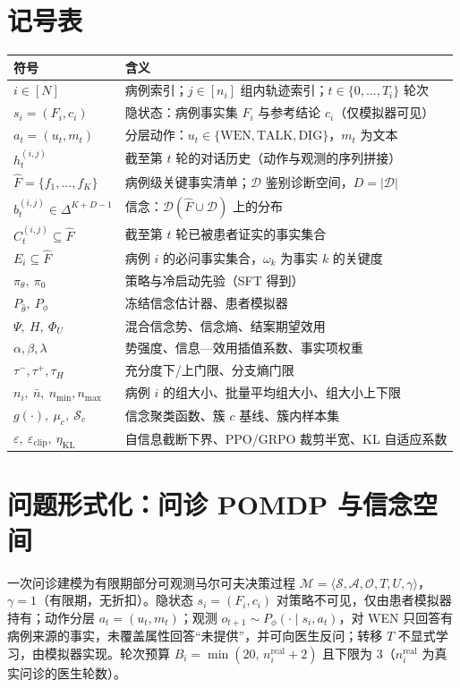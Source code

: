 \documentclass[11pt,a4paper]{ctexart}
\newcommand{\1}[1]{\mathbb{1}\!\left[#1\right]}
\newcommand{\Fhat}{\hat{F}}
\newcommand{\Dcal}{\mathcal{D}}
\newcommand{\Ocal}{\mathcal{O}}
\newcommand{\Scal}{\mathcal{S}}
\begin{document}
\section{记号表}
\begin{table}[h]\centering
\begin{tabular}{ll}
\toprule
符号 & 含义 \\
\midrule
$i \in [N]$ & 病例索引；$j \in [n_i]$ 组内轨迹索引；$t \in \{0,\dots,T_i\}$ 轮次 \\
$s_i=(F_i,c_i)$ & 隐状态：病例事实集 $F_i$ 与参考结论 $c_i$（仅模拟器可见） \\
$a_t=(u_t,m_t)$ & 分层动作：$u_t\in\{\mathrm{WEN},\mathrm{TALK},\mathrm{DIG}\}$，$m_t$ 为文本 \\
$h_t^{(i,j)}$ & 截至第 $t$ 轮的对话历史（动作与观测的序列拼接） \\
$\Fhat=\{f_1,\dots,f_K\}$ & 病例级关键事实清单；$\Dcal$ 鉴别诊断空间，$D=|\Dcal|$ \\
$b_t^{(i,j)}\in\Delta^{K+D-1}$ & 信念：$\Dcal(\Fhat\cup\Dcal)$ 上的分布 \\
$C_t^{(i,j)}\subseteq\Fhat$ & 截至第 $t$ 轮已被患者证实的事实集合 \\
$E_i\subseteq\Fhat$ & 病例 $i$ 的必问事实集合，$\omega_k$ 为事实 $k$ 的关键度 \\
$\pi_\theta,\ \pi_0$ & 策略与冷启动先验（SFT 得到） \\
$P_{\hat\theta},\ P_\phi$ & 冻结信念估计器、患者模拟器 \\
$\Psi,\ H,\ \Phi_U$ & 混合信念势、信念熵、结案期望效用 \\
$\alpha,\beta,\lambda$ & 势强度、信息—效用插值系数、事实项权重 \\
$\tau^-,\tau^+,\tau_H$ & 充分度下/上门限、分支熵门限 \\
$n_i,\ \bar n,\ n_{\min},n_{\max}$ & 病例 $i$ 的组大小、批量平均组大小、组大小上下限 \\
$g(\cdot),\ \mu_c,\ \Scal_c$ & 信念聚类函数、簇 $c$ 基线、簇内样本集 \\
$\varepsilon,\ \varepsilon_{\mathrm{clip}},\ \eta_{\mathrm{KL}}$ & 自信息截断下界、PPO/GRPO 裁剪半宽、KL 自适应系数 \\
\bottomrule
\end{tabular}
\end{table}

\section{问题形式化：问诊 POMDP 与信念空间}
一次问诊建模为有限期部分可观测马尔可夫决策过程
$\mathcal{M}=\langle\Scal,\mathcal{A},\Ocal,T,U,\gamma\rangle$，
$\gamma=1$（有限期，无折扣）。隐状态 $s_i=(F_i,c_i)$ 对策略不可见，仅由患者模拟器持有；动作分层 $a_t=(u_t,m_t)$；观测 $o_{t+1}\sim P_\phi(\cdot\mid s_i,a_t)$，对 WEN 只回答有病例来源的事实，未覆盖属性回答``未提供''，并可向医生反问；转移 $T$ 不显式学习，由模拟器实现。轮次预算 $B_i=\min(20,\,n_i^{\mathrm{real}}+2)$ 且下限为 3（$n_i^{\mathrm{real}}$ 为真实问诊的医生轮数）。
\end{document}
